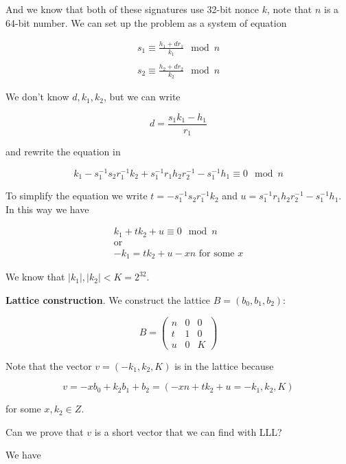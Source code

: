 \documentclass[a4paper,12pt]{report}
\begin{document}
And we know that both of these signatures use 32-bit nonce $k$, note that $n$ is a 64-bit number. We can set up the problem as a system of equation

\[
    \begin{array}{c}
        s_1 \equiv \displaystyle\frac{h_1 + dr_1}{k_1} \mod n \\ \\ 
        s_2 \equiv \displaystyle\frac{h_2 + dr_2}{k_2} \mod n
    \end{array}
\]

We don't know $d, k_1, k_2$, but we can write 

\[
    d = \displaystyle\frac{s_1k_1 - h_1}{r_1}
\]

and rewrite the equation in

\[
    k_1 - s_1^{-1}s_2r_1^{-1}k_2 + s_1^{-1}r_1h_2r_2^{-1} - s_1^{-1}h_1 \equiv 0 \mod n
\]

To simplify the equation we write $t = - s_1^{-1}s_2r_1^{-1}k_2$ and $u = s_1^{-1}r_1h_2r_2^{-1} - s_1^{-1}h_1$. In this way we have

\[
    \begin{array}{c}
        k_1 + tk_2 + u \equiv 0 \mod n \\
        \text{or} \\
        -k_1 = tk_2 + u - xn \text{   for some $x$}
    \end{array}
\]

We know that $|k_1|, |k_2| < K = 2^{32}$.

\vspace*{10px}

\textbf{Lattice construction}. We construct the lattice $B = (b_0, b_1, b_2)$:

\[
    B = 
    \begin{pmatrix}
        n & 0 & 0 \\
        t & 1 & 0 \\
        u & 0 & K
    \end{pmatrix}
\]

Note that the vector $v = (-k_1, k_2, K)$ is in the lattice because

\[
    v = -xb_0 + k_2b_1 + b_2 = (-xn + tk_2 + u = -k_1, k_2, K)
\]

for some $x, k_2 \in Z$.

\vspace*{10px}

Can we prove that $v$ is a short vector that we can find with LLL?

We have 
\end{document}
